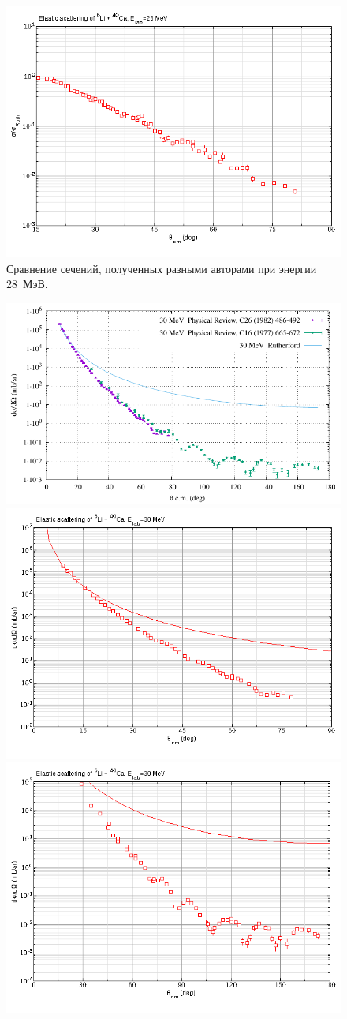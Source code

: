 \documentclass[a4paper, 12pt]{article}
\begin{document}
\begin{figure}
	\includegraphics[width=.49\linewidth]{figures/003-28mev-ratio.png}
	\caption{Сравнение сечений, полученных разными авторами при энергии 28~МэВ.~\cite{26-28-30-34mev,28-34mev}}
	\label{fig:28mev-cmp}
\end{figure}%

\begin{figure}%
	\centering
	\includegraphics[width=\linewidth]{figures/cmp-30mev-abs.pdf}
	\includegraphics[width=.49\linewidth]{figures/010-30mev-abs.png}
	\includegraphics[width=.49\linewidth]{figures/004-30mev-abs.png}

\end{figure}
\end{document}
